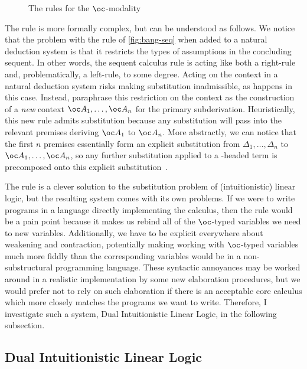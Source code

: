 \begin{figure}
  \caption{The \citet{BBdePH93} rules for the $\oc$-modality}
  \label{fig:BBdePH}
\end{figure}

The \citeauthor{BBdePH93}  rule is more formally complex, but
can be understood as follows.
We notice that the problem with the  rule of
\cref{fig:bang-seq} when added to a natural deduction system is that it
restricts the types of assumptions in the concluding sequent.
In other words, the sequent calculus  rule is acting like
both a right-rule and, problematically, a left-rule, to some degree.
Acting on the context in a natural deduction system risks making substitution
inadmissible, as happens in this case.
Instead, \citeauthor{BBdePH93} paraphrase this restriction on the context as the
construction of a \emph{new} context $\oc A_1, \ldots, \oc A_n$ for the primary
subderivation.
Heuristically, this new  rule admits substitution because any
substitution will pass into the relevant premises deriving $\oc A_1$ to
$\oc A_n$.
More abstractly, we can notice that the first $n$ premises essentially form an
explicit substitution from $\Delta_1, \ldots, \Delta_n$ to
$\oc A_1, \ldots, \oc A_n$, so any further substitution applied
to a -headed term is precomposed onto this explicit
substitution~\citep{ACCL91}.

The \citeauthor{BBdePH93}  rule is a clever solution to the
substitution problem of (intuitionistic) linear logic, but the resulting system
comes with its own problems.
If we were to write programs in a language directly implementing the
\citeauthor{BBdePH93} calculus, then the  rule would be a
pain point because it makes us rebind all of the $\oc$-typed variables we need to
new variables.
Additionally, we have to be explicit everywhere about weakening and contraction,
potentially making working with $\oc$-typed variables much more fiddly than the
corresponding variables would be in a non-substructural programming language.
These syntactic annoyances may be worked around in a realistic implementation by
some new elaboration procedures, but we would prefer not to rely on such
elaboration if there is an acceptable core calculus which more closely matches
the programs we want to write.
Therefore, I investigate such a system, Dual Intuitionistic Linear Logic, in the
following subsection.

\subsection{Dual Intuitionistic Linear Logic}\label{sec:dill}

